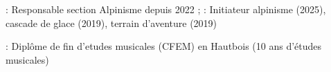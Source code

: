 
\begin{cventries}
  \cventry
  {} %
  {} %
  {} %
  {} %
  {
    \begin{cvitems} %
    \item {}:
      Responsable section Alpinisme depuis 2022 ;  : Initiateur
      alpinisme (2025), cascade de glace (2019), terrain d'aventure (2019)
    \item {}: Diplôme de fin
      d'etudes musicales (CFEM) en Hautbois (10 ans d'études musicales)
    \end{cvitems}
  }

\end{cventries}
